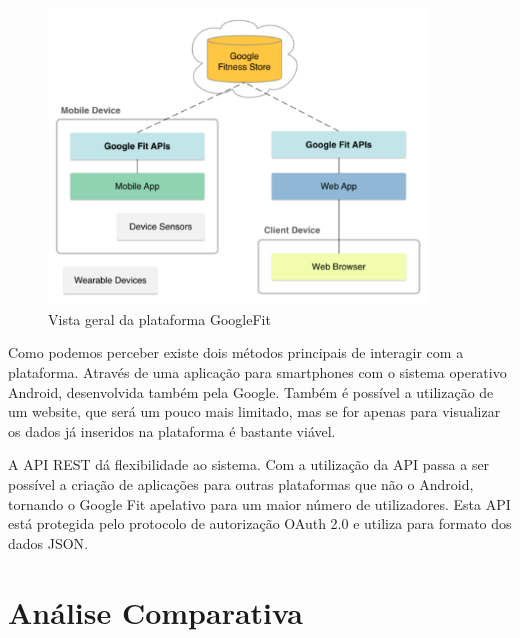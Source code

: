 \begin{figure}[!ht]
  \centering
  \includegraphics[width=0.9\textwidth]{imgs/googleFitOverview.PNG}
  \caption[Vista geral da plataforma GoogleFit]{Vista geral da plataforma GoogleFit \cite{googlefit}}
  
  \label{f:googleFitOverview}
\end{figure}

Como podemos perceber existe dois métodos principais de interagir com a plataforma. Através de uma aplicação para smartphones com o sistema operativo Android, desenvolvida também pela Google.  Também é possível a utilização de um website, que será um pouco mais limitado, mas se for apenas para visualizar os dados já inseridos na plataforma é bastante viável.

A \gls{API} \gls{REST} dá flexibilidade ao sistema. Com a utilização da \gls{API} passa a ser possível a criação de aplicações para outras plataformas que não o Android, tornando o Google Fit apelativo para um maior número de utilizadores. Esta \gls{API} está protegida pelo protocolo de autorização OAuth 2.0 e utiliza para formato dos dados \gls{JSON}\cite{googlegetstarted}. 

\section{Análise Comparativa}

